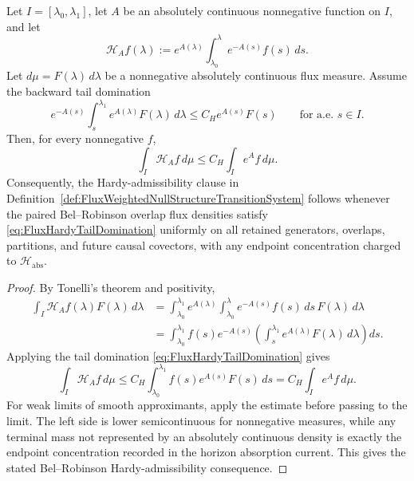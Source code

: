 \begin{lemma}\label{lem:OneDimensionalFluxHardyCriterion}
Let $I=[\lambda_0,\lambda_1]$, let $A$ be an absolutely continuous nonnegative function on $I$, and let
\[
    \mathcal H_A f(\lambda)
    :=
    e^{A(\lambda)}
    \int_{\lambda_0}^{\lambda}e^{-A(s)}f(s)\,ds .
\]
Let $d\mu=F(\lambda)\,d\lambda$ be a nonnegative absolutely continuous flux measure.  Assume the backward tail domination
\begin{equation}\label{eq:FluxHardyTailDomination}
    e^{-A(s)}
    \int_s^{\lambda_1}e^{A(\lambda)}F(\lambda)\,d\lambda
    \le
    C_H e^{A(s)}F(s)
    \qquad\text{for a.e. }s\in I .
\end{equation}
Then, for every nonnegative $f$,
\[
    \int_I \mathcal H_A f\,d\mu
    \le
    C_H\int_I e^A f\,d\mu .
\]
Consequently, the Hardy-admissibility clause in Definition~\ref{def:FluxWeightedNullStructureTransitionSystem} follows whenever the paired Bel--Robinson overlap flux densities satisfy \eqref{eq:FluxHardyTailDomination} uniformly on all retained generators, overlaps, partitions, and future causal covectors, with any endpoint concentration charged to $\mathcal H_{\mathrm{abs}}$.
\end{lemma}

\begin{proof}
By Tonelli's theorem and positivity,
\[
\begin{split}
    \int_I \mathcal H_A f(\lambda)F(\lambda)\,d\lambda
    &=
    \int_{\lambda_0}^{\lambda_1}
    e^{A(\lambda)}
    \int_{\lambda_0}^{\lambda}e^{-A(s)}f(s)\,ds\,
    F(\lambda)\,d\lambda \\
    &=
    \int_{\lambda_0}^{\lambda_1}
    f(s)e^{-A(s)}
    \left(
        \int_s^{\lambda_1}e^{A(\lambda)}F(\lambda)\,d\lambda
    \right)ds .
\end{split}
\]
Applying the tail domination \eqref{eq:FluxHardyTailDomination} gives
\[
    \int_I \mathcal H_A f\,d\mu
    \le
    C_H\int_{\lambda_0}^{\lambda_1}f(s)e^{A(s)}F(s)\,ds
    =
    C_H\int_I e^A f\,d\mu .
\]
For weak limits of smooth approximants, apply the estimate before passing to the limit.  The left side is lower semicontinuous for nonnegative measures, while any terminal mass not represented by an absolutely continuous density is exactly the endpoint concentration recorded in the horizon absorption current.  This gives the stated Bel--Robinson Hardy-admissibility consequence.
\end{proof}

